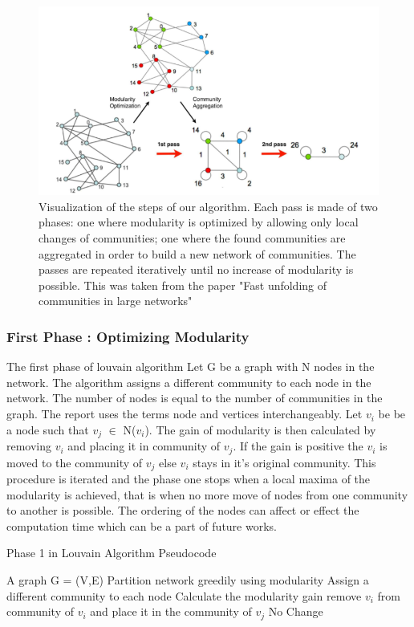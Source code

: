  \begin{figure}[h]

\includegraphics[scale=0.5]{loustep.png}
\caption{\label{loupic} Visualization of the steps of our algorithm. Each pass is made of two phases:
one where modularity is optimized by allowing only local changes of communities;
one where the found communities are aggregated in order to build a new network of
communities. The passes are repeated iteratively until no increase of modularity is
possible. This was taken from the paper "Fast unfolding of communities in large networks" \cite{louvain}}
\centering
\end{figure}

\subsubsection{First Phase : Optimizing Modularity}
The first phase of louvain algorithm 
Let G be a graph with N nodes in the network. The algorithm assigns a different community to each node in the network.  The number of nodes is equal to the number of communities in the graph. The report uses the terms node and vertices interchangeably.  Let $v_i$ be be a node such that $v_j$ $\in$ N($v_i$). The gain of modularity is then calculated by removing $v_i$ and placing it in community of $v_j$. If the gain is positive the $v_i$ is moved to the community of $v_j$ else $v_i$ stays in it's original community. This procedure is iterated and the phase one stops when a local maxima of the modularity is achieved, that is when no more move of nodes from one community to another is possible. The ordering of the nodes can affect or effect the computation time which can be a part of future works. 

\begin{algorithm}[H]
\caption{Phase 1 in Louvain Algorithm Pseudocode}
\begin{algorithmic} 
\REQUIRE A graph G = (V,E)
\ENSURE Partition network greedily using modularity
\STATE Assign a different community to each node
\STATE Calculate the modularity gain
\STATE remove $v_i$ from community of $v_i$ and place it in the community of $v_j$
\ELSE 
\STATE No Change
\ENDIF
\ENDFOR
\ENDWHILE
\end{algorithmic}
\end{algorithm}

